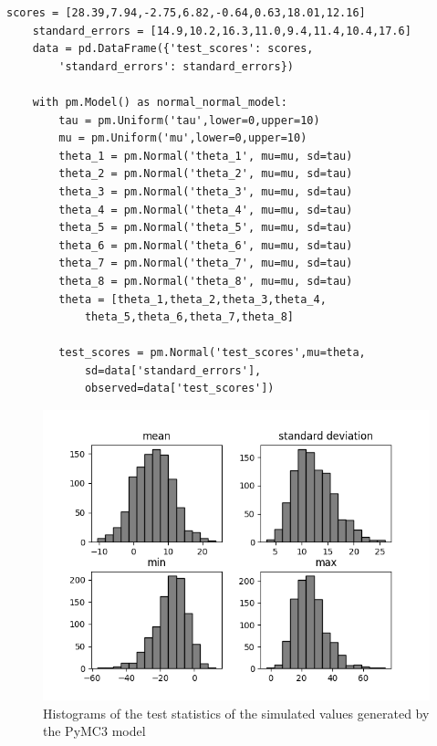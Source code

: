 \documentclass{article}
\begin{document}
\begin{lstlisting}[caption={PyMC3 model of the eight schools example}, label={list:eight_schools_PyMC3_code},captionpos=b]
    scores = [28.39,7.94,-2.75,6.82,-0.64,0.63,18.01,12.16]
    standard_errors = [14.9,10.2,16.3,11.0,9.4,11.4,10.4,17.6]
    data = pd.DataFrame({'test_scores': scores, 
        'standard_errors': standard_errors})

    with pm.Model() as normal_normal_model:
        tau = pm.Uniform('tau',lower=0,upper=10)
        mu = pm.Uniform('mu',lower=0,upper=10)
        theta_1 = pm.Normal('theta_1', mu=mu, sd=tau)
        theta_2 = pm.Normal('theta_2', mu=mu, sd=tau)
        theta_3 = pm.Normal('theta_3', mu=mu, sd=tau)
        theta_4 = pm.Normal('theta_4', mu=mu, sd=tau)
        theta_5 = pm.Normal('theta_5', mu=mu, sd=tau)
        theta_6 = pm.Normal('theta_6', mu=mu, sd=tau)
        theta_7 = pm.Normal('theta_7', mu=mu, sd=tau)
        theta_8 = pm.Normal('theta_8', mu=mu, sd=tau)
        theta = [theta_1,theta_2,theta_3,theta_4,
            theta_5,theta_6,theta_7,theta_8]

        test_scores = pm.Normal('test_scores',mu=theta,
            sd=data['standard_errors'], 
            observed=data['test_scores'])
\end{lstlisting}
\begin{figure}
	\includegraphics[width=\textwidth]{images/eight_schools_pymc3_summaries_plot.png}
	\caption[Histograms of the test statistics of the simulated values generated by the PyMC3 model]{Histograms of the test statistics of the simulated values generated by the PyMC3 model}
	\label{fig:eightschools_PyMC3_summaries_plot}
\end{figure}
\end{document}
